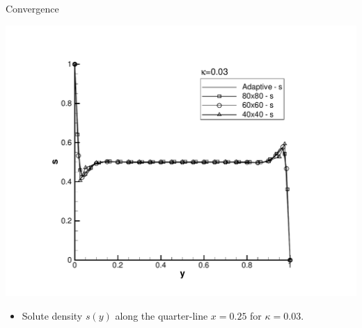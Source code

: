 \documentclass[compress,12pt]{beamer}
\begin{document}
\begin{frame}{Convergence}
  \begin{center}
    \includegraphics[viewport=124 40 670 550,width=.65\textwidth,clip=true]{figures/s_x_equal_0_point_25}
    \begin{itemize}
    \item Solute density $s(y)$ along the quarter-line $x=0.25$ for $\kappa=0.03$.
    \end{itemize}
  \end{center}      
\end{frame}
\end{document}
